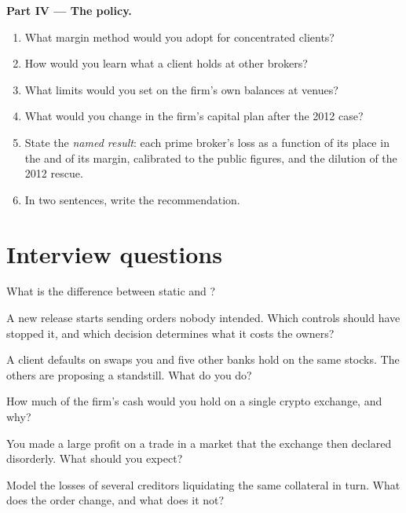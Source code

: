 \begin{problem}
\medskip\noindent\textbf{Part IV --- The policy.}
\begin{enumerate}[resume]
\item What margin method would you adopt for concentrated clients?
\item How would you learn what a client holds at other brokers?
\item What limits would you set on the firm's own balances at venues?
\item What would you change in the firm's capital plan after the 2012 case?
\item State the \emph{named result}: each prime broker's loss as a function of its place in the  and of its margin, calibrated to the public
figures, and the dilution of the 2012 rescue.
\item In two sentences, write the recommendation.
\end{enumerate}
\end{problem}

\section{Interview questions}

\begin{interviewq}\label{iq:fm:case-studies-ii:1}
What is the difference between static and ?
\end{interviewq}

\begin{interviewq}\label{iq:fm:case-studies-ii:2}
A new release starts sending orders nobody intended. Which controls should have stopped it, and which decision determines what it costs the owners?
\end{interviewq}

\begin{interviewq}\label{iq:fm:case-studies-ii:3}
A client defaults on swaps you and five other banks hold on the same stocks. The others are proposing a standstill. What do you do?
\end{interviewq}

\begin{interviewq}\label{iq:fm:case-studies-ii:4}
How much of the firm's cash would you hold on a single crypto exchange, and why?
\end{interviewq}

\begin{interviewq}\label{iq:fm:case-studies-ii:5}
You made a large profit on a trade in a market that the exchange then declared disorderly. What should you expect?
\end{interviewq}

\begin{interviewq}\label{iq:fm:case-studies-ii:6}
Model the losses of several creditors liquidating the same collateral in turn. What does the order change, and what does it not?
\end{interviewq}
